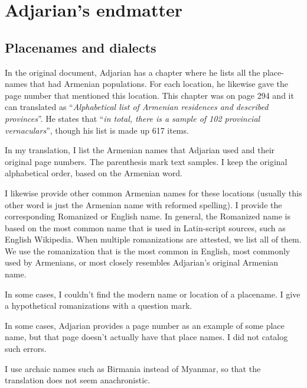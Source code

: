 \part{Adjarian's endmatter}
\chapter{Placenames and dialects}



In the original document, Adjarian has a chapter where he lists all the place-names that had Armenian populations. For each location, he likewise gave the page number that mentioned this location.  This chapter was on page   294 and it can translated as ``\textit{Alphabetical list of Armenian residences and described provinces}''. He states that ``\textit{in total, there is a sample of 102 provincial vernaculars}'', though his list is made up 617 items.

In my translation, I list the Armenian names that Adjarian used and their original page numbers. The parenthesis mark text samples. I keep the original alphabetical order, based on the Armenian word.

I likewise provide other common Armenian names for these locations (usually this other word is just the Armenian name with reformed spelling). I provide  the corresponding Romanized or English name. In general, the Romanized name is based on the most common name that is used in Latin-script sources, such as English Wikipedia. When multiple romanizations are attested, we list all of them. We use the romanization that is the most common in English, most commonly used by Armenians, or most closely resembles Adjarian's original Armenian name.

In some cases, I couldn't find the modern name or location of a placename. I give a hypothetical romanizations with a question mark. 

In some cases, Adjarian provides a page number as an example of some place name, but that page doesn't actually have that place names. I did not  catalog such errors. 

I use archaic names such as Birmania instead of Myanmar, so that the translation does not seem anachronistic. 



